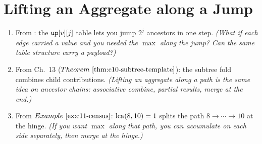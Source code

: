 \section{Lifting an Aggregate along a Jump}\label{sec:c11-aggregates}

\begin{previouslybox}
\begin{enumerate}[nosep, leftmargin=1.8em]
  \item From : the \(\texttt{up}[v][j]\) table lets you
        jump \(2^j\) ancestors in one step.  \emph{(What if each edge
        carried a \emph{value} and you needed the \(\max\) along the
        jump?  Can the same table structure carry a payload?)}
  \item From Ch.~13 (\(\thmref{c10-subtree-template}\)): the subtree fold
        combines child contributions.  \emph{(Lifting an aggregate along
        a path is the same idea on \emph{ancestor chains}: associative
        combine, partial results, merge at the end.)}
  \item From \(\exref{c11-census}\): \(\operatorname{lca}(8,10) = 1\) splits the path
        \(8\to\cdots\to10\) at the hinge.  \emph{(If you want
        \(\max\) along that path, you can accumulate on each side
        separately, then merge at the hinge.)}
\end{enumerate}
\end{previouslybox}

